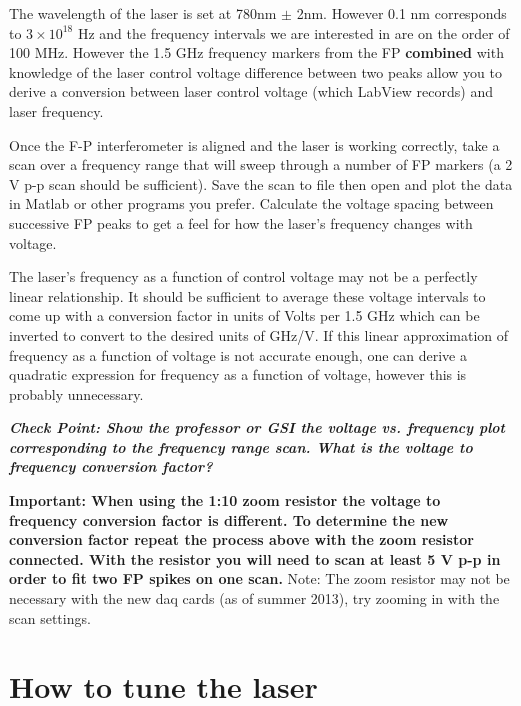 \documentclass{../lab}
\begin{document}
The wavelength of the laser is set at 780nm $\pm$ 2nm. However 0.1 nm corresponds to $3 \times 10^{18}$ Hz and the frequency intervals we are interested in are on the order of 100 MHz. However the 1.5 GHz frequency markers from the FP \textbf{combined} with knowledge of the laser control voltage difference between two peaks allow you to derive a conversion between laser control voltage (which LabView records) and laser frequency.

Once the F-P interferometer is aligned and the laser is working correctly, take a scan over a frequency range that will sweep through a number of FP markers (a 2 V p-p scan should be sufficient). Save the scan to file then open and plot the data in Matlab or other programs you prefer. Calculate the voltage spacing between successive FP peaks to get a feel for how the laser's frequency changes with voltage.

The laser's frequency as a function of control voltage may not be a perfectly linear relationship. It should be sufficient to average these voltage intervals to come up with a conversion factor in units of Volts per 1.5 GHz which can be inverted to convert to the desired units of GHz/V. If this linear approximation of frequency as a function of voltage is not accurate enough, one can derive a quadratic expression for frequency as a function of voltage, however this is probably unnecessary.

\emph{\textbf{Check Point: Show the professor or GSI the voltage vs. frequency plot corresponding to the frequency range scan. What is the voltage to frequency conversion factor?}} 

\textbf{Important: When using the 1:10 zoom resistor the voltage to frequency conversion factor is different. To determine the new conversion factor repeat the process above with the zoom resistor connected. With the resistor you will need to scan at least 5 V p-p in order to fit two FP spikes on one scan.} Note: The zoom resistor may not be necessary with the new daq cards (as of summer 2013), try zooming in with the scan settings.

\section{How to tune the laser}
\end{document}
